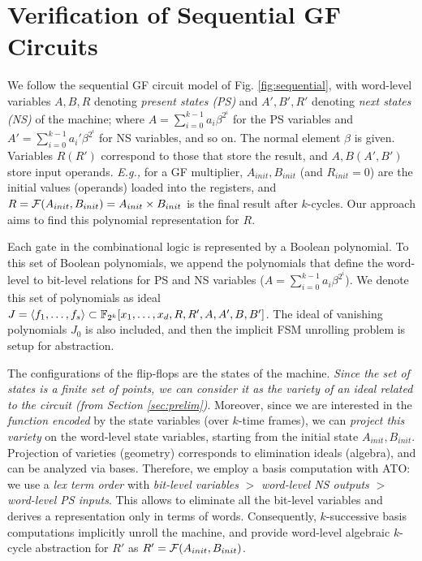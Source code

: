 \section{Verification of Sequential GF Circuits}
\label{sec:theory}

We follow  the sequential GF circuit model of
Fig. \ref{fig:sequential}, with word-level variables $A, B, R$
denoting {\it present states (PS)} and $A', B', R'$ denoting {\it next
  states (NS)} of the machine; where $A = \sum_{i=0}^{k-1} a_i \beta^{2^i}$
for the PS variables and $A' = \sum_{i=0}^{k-1} a_i'
\beta^{2^i}$ for NS variables, and so on. The normal element $\beta$ is
given. Variables $R (R')$ correspond to those that 
store the result, and $A, B (A', B')$ store input operands. {\it E.g.,}
for a GF multiplier, $A_{init}, B_{init}$ (and $R_{init} =
0$) are the initial values (operands) loaded into the registers,  and
$R = {\mathcal{F}}(A_{init}, B_{init}) = A_{init} \times B_{init}$ is the final
result after $k$-cycles. Our approach aims to find this polynomial
representation for $R$.  

Each gate in the combinational logic is represented by a Boolean
polynomial. To 
this set of Boolean polynomials, we append the polynomials that define
the word-level to bit-level relations for PS and NS variables ($A =
\sum_{i=0}^{k-1} a_i \beta^{2^i}$). We denote this set of polynomials
as ideal $J = \langle 
f_1, \dots, f_s \rangle \subset {\mathbb{F}}_{2^k}[x_1, \dots, x_d, R, R', A, A', B,
  B']$. The ideal of vanishing polynomials $J_0$ is also included, and
then the implicit FSM unrolling problem is setup for abstraction. 

The configurations of the flip-flops are the states of the
machine. {\it Since the set of states is a finite set of points, we
can consider it as the variety of an ideal related to the circuit
(from Section \ref{sec:prelim})}. Moreover, since we are interested in
the {\it function encoded} by the state variables (over $k$-time
frames), we can {\it project this variety} on the word-level state
variables, starting from the initial state $A_{init}, B_{init}$.
Projection of varieties (geometry) corresponds to elimination ideals
(algebra), and can be analyzed via \Grobner bases. Therefore, we
employ a \Grobner basis computation with ATO: we use a {\it lex term
  order} with {\it bit-level variables} 
$>$ {\it word-level NS outputs} $>$ {\it word-level PS inputs}. This
allows to eliminate all the bit-level variables 
and derives a representation only in terms of words. 
Consequently, $k$-successive \Grobner basis computations implicitly
unroll the machine, and provide word-level algebraic $k$-cycle
abstraction for $R'$ as $R' = {\mathcal{F}}(A_{init}, B_{init})$. 

